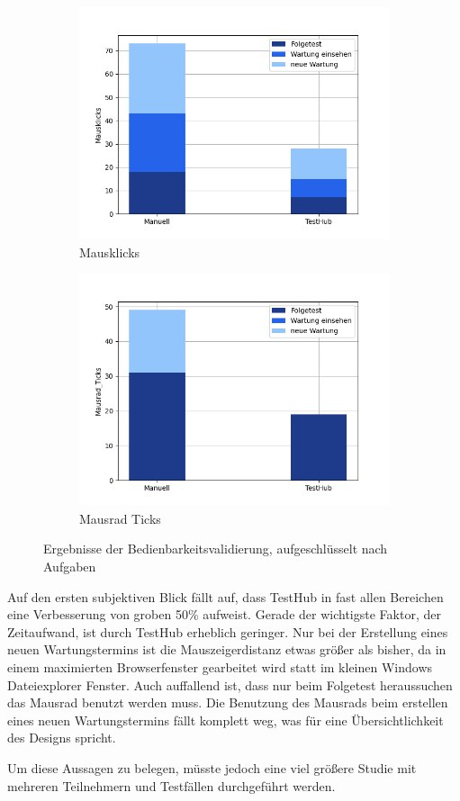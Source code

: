 \begin{figure}[H]
\begin{subfigure}{.5\textwidth}
        \includegraphics[width=\linewidth]{speedtests/validierung_Mausklicks.png}
        \caption{Mausklicks}
      \end{subfigure}%
      \begin{subfigure}{.5\textwidth}
        \centering
        \includegraphics[width=\linewidth]{speedtests/validierung_Mausrad_Ticks.png}
        \caption{Mausrad Ticks}
      \end{subfigure}
    \caption{Ergebnisse der Bedienbarkeitsvalidierung, aufgeschlüsselt nach Aufgaben}
\end{figure}

Auf den ersten subjektiven Blick fällt auf, dass TestHub in fast allen Bereichen eine 
Verbesserung von groben 50\% aufweist. Gerade der wichtigste Faktor, der Zeitaufwand, ist durch TestHub 
erheblich geringer. Nur bei der Erstellung eines neuen Wartungstermins
ist die Mauszeigerdistanz etwas größer als bisher, da in einem maximierten Browserfenster
gearbeitet wird statt im kleinen Windows Dateiexplorer Fenster. Auch auffallend ist,
dass nur beim Folgetest heraussuchen das Mausrad benutzt werden muss. Die Benutzung des 
Mausrads beim erstellen eines neuen Wartungstermins fällt komplett weg, was für 
eine Übersichtlichkeit des Designs spricht.

Um diese Aussagen zu belegen, müsste jedoch eine viel größere Studie mit mehreren 
Teilnehmern und Testfällen durchgeführt werden.



